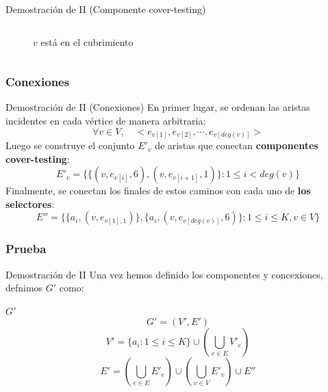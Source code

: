 \documentclass{beamer}
\begin{document}
\begin{frame}{Demostración de II (Componente cover-testing)}
\begin{columns}
\begin{figure}
            \caption{$v$ está en el cubrimiento}
            \label{fig:my_label}
        \end{figure}
    \end{columns}
\end{frame}

\subsubsection{Conexiones}
\begin{frame}{Demostración de II (Conexiones)}
    En primer lugar, se ordenan las aristas incidentes en cada vértice de manera arbitraria:
    \[\forall v \in V, \quad <e_{v[1]}, e_{v[2]}, \cdots, e_{v[deg(v)]}>\]
    Luego se construye el conjunto $E'_v$ de aristas que conectan \textbf{componentes cover-testing}:
    \[E'_v = \{\{(v, e_{v[i]}, 6), (v, e_{v[i+1]},1)\} : 1 \le i < deg(v)\}\]
    Finalmente, se conectan los finales de estos caminos con cada uno de \textbf{los selectores}:
    \[E'' = \{\{a_i, (v,e_{v[1], 1})\},\{a_i, (v,e_{v[deg(v)]}, 6)\} : 1 \le i \le K, v \in V \}\]
\end{frame}

\subsubsection{Prueba}
\begin{frame}{Demostración de II}
    Una vez hemos definido los componentes y concexiones, defnimos $G'$ como:
    \begin{block}{$G'$}
        \[G' = (V', E')\]
        \[V' = \{a_i : 1 \le i \le K\} \cup (\bigcup_{e \in E} V'_e)\]
        \[E' = (\bigcup_{e \in E} E'_e) \cup (\bigcup_{v \in V} E'_v) \cup E''\]
    \end{block}
\end{frame}
\end{document}

